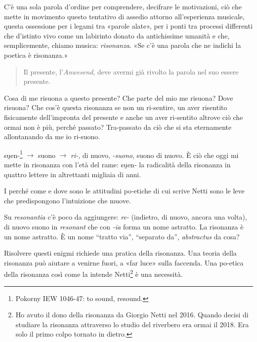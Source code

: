 C'è una sola parola d'ordine per comprendere, decifrare le motivazioni, ciò che
mette in movimento questo tentativo di assedio attorno all'esperienza musicale,
questa ossessione per i legami tra «parole alate», per i ponti tra processi
differenti che d'istinto vivo come un labirinto donato da antichissime umanità e
che, semplicemente, chiamo musica: \emph{risonanza}. «Se c’è una parola che ne
indichi la poetica è risonanza.» \cite{netti24}

\begin{quote}
  \begin{sf}
    \small
    Il presente, l'\emph{Anwesend}, deve avermi già rivolto la parola nel suo
    essere presente. \cite{agamben19}
  \end{sf}
\end{quote}

Cosa di me risuona a questo presente? Che parte del mio me risuona? Dove risuona?
Che cos'è questa risonanza se non un ri-sentire, un aver risentito fisicamente
dell'impronta del presente e anche un aver ri-sentito altrove ciò che ormai non
è più, perché passato? Tra-passato da ciò che si sta eternamente allontanando da
me io ri-suono. \cite{ronchi2001}

{\phonfont su̯en-}\footnote{Pokorny IEW 1046-47: to sound, resound.} $ \rightarrow $
suono $ \rightarrow $ \emph{ri-}, di nuovo, \emph{-suono}, suono di nuovo. È
ciò che oggi mi mette in risonanza con l'età del rame: {\phonfont su̯en-} la radicalità
della risonanza in quattro lettere in altrettanti migliaia di anni.

I perché come e dove sono le attitudini po-etiche di cui scrive Netti \cite{netti24}
sono le leve che predispongono l'intuizione che muove.

Su \emph{resonantia} c'è poco da aggiungere: \emph{re-} (indietro, di nuovo,
ancora una volta), di nuovo suono in \emph{resonant} che con \emph{-ia} forma
un nome astratto. La risonanza è un nome astratto. È un nome “tratto via”,
“separato da”, \emph{abstractus} da cosa?

Risolvere questi enigmi richiede una pratica della risonanza. Una teoria della
risonanza può aiutare a venirne fuori, a «far luce» \cite{ronchi2001} sulla
faccenda. Una po-etica della risonanza così come la intende Netti\footnote{
  Ho avuto il dono della risonanza da Giorgio Netti nel 2016. Quando decisi di
  studiare la risonanza attraverso lo studio del riverbero era ormai il 2018.
  Era solo il primo colpo tornato in dietro.
} \cite{netti24}
è una necessità.

